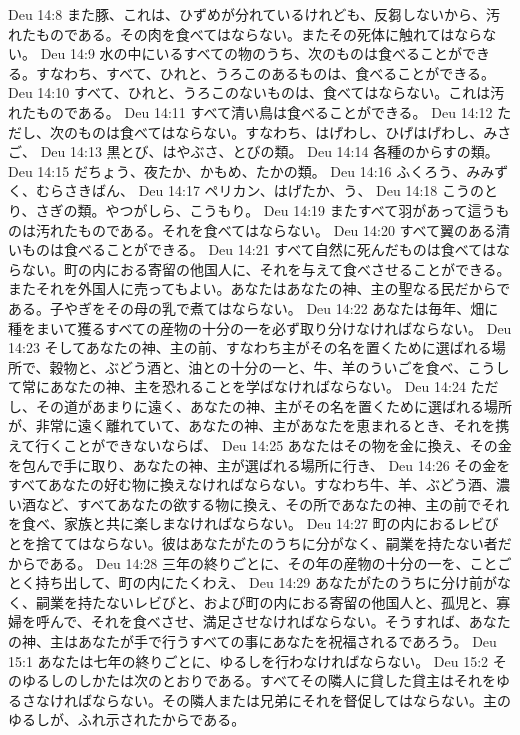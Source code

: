 Deu 14:8  また豚、これは、ひずめが分れているけれども、反芻しないから、汚れたものである。その肉を食べてはならない。またその死体に触れてはならない。
Deu 14:9  水の中にいるすべての物のうち、次のものは食べることができる。すなわち、すべて、ひれと、うろこのあるものは、食べることができる。
Deu 14:10  すべて、ひれと、うろこのないものは、食べてはならない。これは汚れたものである。
Deu 14:11  すべて清い鳥は食べることができる。
Deu 14:12  ただし、次のものは食べてはならない。すなわち、はげわし、ひげはげわし、みさご、
Deu 14:13  黒とび、はやぶさ、とびの類。
Deu 14:14  各種のからすの類。
Deu 14:15  だちょう、夜たか、かもめ、たかの類。
Deu 14:16  ふくろう、みみずく、むらさきばん、
Deu 14:17  ペリカン、はげたか、う、
Deu 14:18  こうのとり、さぎの類。やつがしら、こうもり。
Deu 14:19  またすべて羽があって這うものは汚れたものである。それを食べてはならない。
Deu 14:20  すべて翼のある清いものは食べることができる。
Deu 14:21  すべて自然に死んだものは食べてはならない。町の内におる寄留の他国人に、それを与えて食べさせることができる。またそれを外国人に売ってもよい。あなたはあなたの神、主の聖なる民だからである。子やぎをその母の乳で煮てはならない。
Deu 14:22  あなたは毎年、畑に種をまいて獲るすべての産物の十分の一を必ず取り分けなければならない。
Deu 14:23  そしてあなたの神、主の前、すなわち主がその名を置くために選ばれる場所で、穀物と、ぶどう酒と、油との十分の一と、牛、羊のういごを食べ、こうして常にあなたの神、主を恐れることを学ばなければならない。
Deu 14:24  ただし、その道があまりに遠く、あなたの神、主がその名を置くために選ばれる場所が、非常に遠く離れていて、あなたの神、主があなたを恵まれるとき、それを携えて行くことができないならば、
Deu 14:25  あなたはその物を金に換え、その金を包んで手に取り、あなたの神、主が選ばれる場所に行き、
Deu 14:26  その金をすべてあなたの好む物に換えなければならない。すなわち牛、羊、ぶどう酒、濃い酒など、すべてあなたの欲する物に換え、その所であなたの神、主の前でそれを食べ、家族と共に楽しまなければならない。
Deu 14:27  町の内におるレビびとを捨ててはならない。彼はあなたがたのうちに分がなく、嗣業を持たない者だからである。
Deu 14:28  三年の終りごとに、その年の産物の十分の一を、ことごとく持ち出して、町の内にたくわえ、
Deu 14:29  あなたがたのうちに分け前がなく、嗣業を持たないレビびと、および町の内におる寄留の他国人と、孤児と、寡婦を呼んで、それを食べさせ、満足させなければならない。そうすれば、あなたの神、主はあなたが手で行うすべての事にあなたを祝福されるであろう。
Deu 15:1  あなたは七年の終りごとに、ゆるしを行わなければならない。
Deu 15:2  そのゆるしのしかたは次のとおりである。すべてその隣人に貸した貸主はそれをゆるさなければならない。その隣人または兄弟にそれを督促してはならない。主のゆるしが、ふれ示されたからである。
